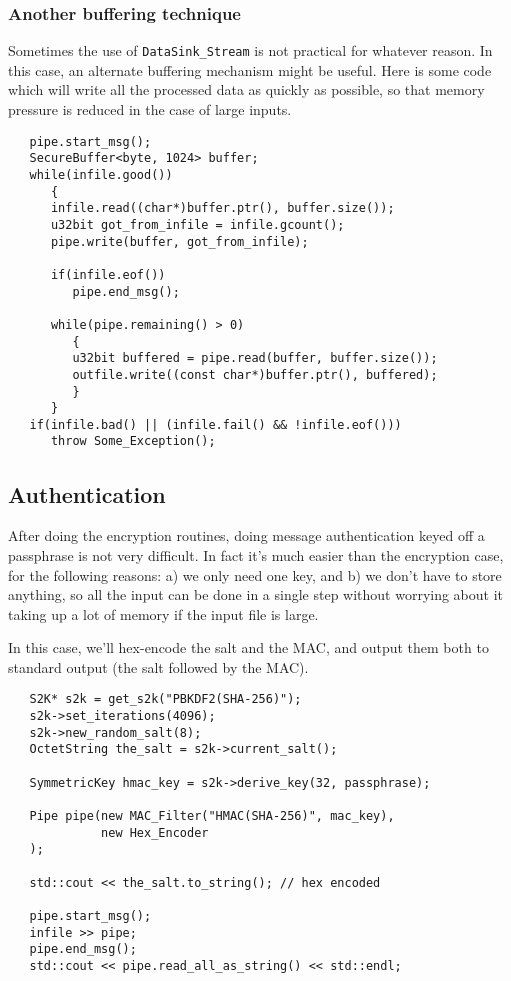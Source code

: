 \documentclass{article}
\newcommand{\type}[1]{\texttt{#1}}
\begin{document}
\subsubsection{Another buffering technique}

Sometimes the use of \type{DataSink\_Stream} is not practical for whatever
reason. In this case, an alternate buffering mechanism might be useful. Here is
some code which will write all the processed data as quickly as possible, so
that memory pressure is reduced in the case of large inputs.

\begin{verbatim}
   pipe.start_msg();
   SecureBuffer<byte, 1024> buffer;
   while(infile.good())
      {
      infile.read((char*)buffer.ptr(), buffer.size());
      u32bit got_from_infile = infile.gcount();
      pipe.write(buffer, got_from_infile);

      if(infile.eof())
         pipe.end_msg();

      while(pipe.remaining() > 0)
         {
         u32bit buffered = pipe.read(buffer, buffer.size());
         outfile.write((const char*)buffer.ptr(), buffered);
         }
      }
   if(infile.bad() || (infile.fail() && !infile.eof()))
      throw Some_Exception();
\end{verbatim}

\pagebreak

\subsection{Authentication}

After doing the encryption routines, doing message authentication keyed off a
passphrase is not very difficult. In fact it's much easier than the encryption
case, for the following reasons: a) we only need one key, and b) we don't have
to store anything, so all the input can be done in a single step without
worrying about it taking up a lot of memory if the input file is large.

In this case, we'll hex-encode the salt and the MAC, and output them both to
standard output (the salt followed by the MAC).

\begin{verbatim}
   S2K* s2k = get_s2k("PBKDF2(SHA-256)");
   s2k->set_iterations(4096);
   s2k->new_random_salt(8);
   OctetString the_salt = s2k->current_salt();

   SymmetricKey hmac_key = s2k->derive_key(32, passphrase);

   Pipe pipe(new MAC_Filter("HMAC(SHA-256)", mac_key),
             new Hex_Encoder
   );

   std::cout << the_salt.to_string(); // hex encoded

   pipe.start_msg();
   infile >> pipe;
   pipe.end_msg();
   std::cout << pipe.read_all_as_string() << std::endl;
\end{verbatim}
\end{document}
